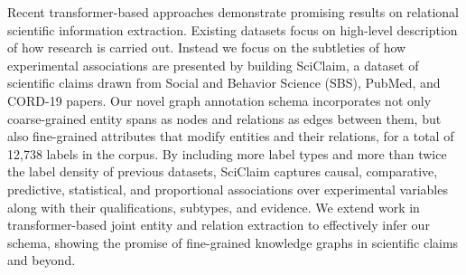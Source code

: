 Recent transformer-based approaches demonstrate promising results on relational scientific information extraction. Existing datasets focus on high-level description of how research is carried out. Instead we focus on the subtleties of how experimental associations are presented by building SciClaim, a dataset of scientific claims drawn from Social and Behavior Science (SBS), PubMed, and CORD-19 papers. Our novel graph annotation schema incorporates not only coarse-grained entity spans as nodes and relations as edges between them, but also fine-grained attributes that modify entities and their relations, for a total of 12,738 labels in the corpus. By including more label types and more than twice the label density of previous datasets, SciClaim captures causal, comparative, predictive, statistical, and proportional associations over experimental variables along with their qualifications, subtypes, and evidence. We extend work in transformer-based joint entity and relation extraction to effectively infer our schema, showing the promise of fine-grained knowledge graphs in scientific claims and beyond.

